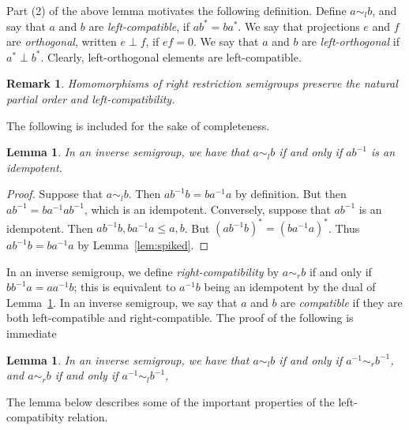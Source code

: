 \documentclass[a4paper]{amsart}
\newtheorem{lemma}[theorem]{Lemma}
\newtheorem{remark}[theorem]{Remark}
\begin{document}
Part (2) of the above lemma motivates the following definition.
Define $a \sim_{l} b$, and say that $a$ and $b$ are {\em left-compatible},  if  $ab^{\ast} = ba^{\ast}$.
We say that projections $e$ and $f$ are {\em orthogonal}, written $e \perp f$,
if $ef = 0$.
We say that $a$ and $b$ are {\em left-orthogonal} if $a^{\ast} \perp b^{\ast}$.
Clearly, left-orthogonal elements are left-compatible.

\begin{remark}
{\em Homomorphisms of right restriction semigroups
preserve the natural partial order and left-compatibility.}
\end{remark}

The following is included for the sake of completeness.

\begin{lemma}\label{lem:yakult}
In an inverse semigroup, 
we have that $a \sim_{l} b$ if and only if $ab^{-1}$ is an idempotent.
\end{lemma}
\begin{proof} Suppose that  $a \sim_{l} b$.
Then $ab^{-1}b = ba^{-1}a$ by definition.
But then $ab^{-1}= ba^{-1}ab^{-1}$, which is an idempotent.
Conversely, suppose that $ab^{-1}$ is an idempotent.
Then $ab^{-1}b, ba^{-1}a \leq a,b$.
But $(ab^{-1}b)^{\ast} = (ba^{-1}a)^{\ast}$.
Thus $ab^{-1}b = ba^{-1}a$ by Lemma~\ref{lem:spiked}.
\end{proof}

In an inverse semigroup, we define {\em right-compatibility}
by $a \sim_{r} b $ if and only if $bb^{-1}a = aa^{-1}b$;
this is equivalent to $a^{-1}b$ being an idempotent by the dual
of Lemma~\ref{lem:yakult}.
In an inverse semigroup, we say that $a$ and $b$ are {\em compatible} if 
they are both left-compatible and right-compatible.
The proof of the following is immediate

\begin{lemma}\label{lem:yoghurt} In an inverse semigroup,
we have that $a \sim_{l} b$ if and only if $a^{-1} \sim_{r} b^{-1}$, 
and  $a \sim_{r} b$ if and only if $a^{-1} \sim_{l} b^{-1}$, 
\end{lemma}

The lemma below describes some of the important properties of the left-compatibity relation.
\end{document}
